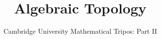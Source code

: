 \documentclass{article}
\title{Algebraic Topology}
\author{Cambridge University Mathematical Tripos: Part II}
\begin{document}
\maketitle

\tableofcontentsnewpage{}

%
\end{document}
